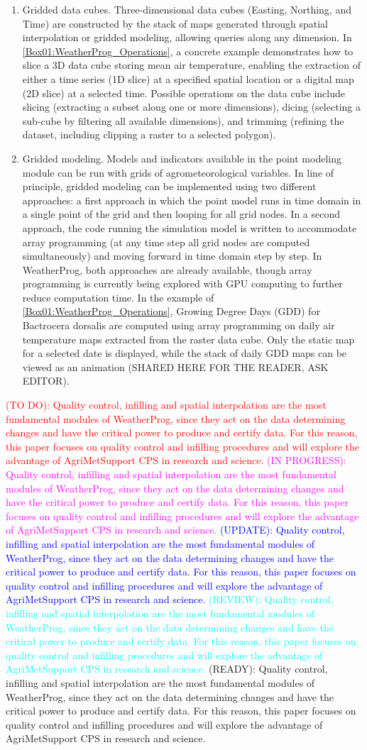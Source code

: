\documentclass[authoryear,preprint,review,12pt]{elsarticle}
\newcommand{\statusblock}[3]{
    \ifthenelse{\equal{#2}{todo}}
        {\textcolor{red}{#1 (TO DO): #3}}
        {}
    \ifthenelse{\equal{#2}{wip}}
        {\textcolor{magenta}{#1 (IN PROGRESS): #3}}
        {}
    \ifthenelse{\equal{#2}{update}}
        {\textcolor{blue}{#1 (UPDATE): #3}}
        {}
    \ifthenelse{\equal{#2}{review}}
        {\textcolor{cyan}{#1 (REVIEW): #3}}
        {}
    \ifthenelse{\equal{#2}{done}}
        {\textcolor{PineGreen}{#1 (READY): #3}}
        {}
}
\begin{document}
\begin{enumerate}
    \item Gridded data cubes. Three-dimensional data cubes (Easting, Northing, and Time) are constructed by the stack of maps generated through spatial interpolation or gridded modeling, allowing queries along any dimension. 
    In \cref{Box01:WeatherProg_Operations}, a concrete example demonstrates how to slice a 3D data cube storing mean air temperature, enabling the extraction of either a time series (1D slice) at a specified spatial location %
    or a digital map (2D slice) at a selected time. %
    Possible operations on the data cube include slicing (extracting a subset along one or more dimensions), dicing (selecting a sub-cube by filtering all available dimensions), and trimming (refining the dataset, including clipping a raster to a selected polygon).
    
    \item Gridded modeling.
    Models and indicators available in the point modeling module can be run with grids of agrometeorological variables.
    In line of principle, gridded modeling can be implemented using two different approaches: a first approach in which the point model runs in time domain in a single point of the grid and then looping for all grid nodes.
    In a second approach, the code running the simulation model is written to accommodate array programming (at any time step all grid nodes are computed simultaneously) and moving forward in time domain step by step.
    In WeatherProg, both approaches are already available, though array programming is currently being explored with GPU computing to further reduce computation time.
    In the example of \cref{Box01:WeatherProg_Operations}, Growing Degree Days (GDD) for Bactrocera dorsalis are computed using array programming on daily air temperature maps extracted from the raster data cube.
    Only the static map for a selected date is displayed, while the stack of daily GDD maps can be viewed as an animation (SHARED HERE FOR THE READER, ASK EDITOR).
\end{enumerate}

\statusblock{}{wip}{Quality control, infilling and spatial interpolation are the most fundamental modules of WeatherProg, since they act on the data determining changes and have the critical power to produce and certify data.
For this reason, this paper focuses on quality control and infilling procedures and will explore the advantage of AgriMetSupport CPS in research and science.}
\end{document}
